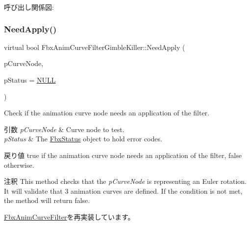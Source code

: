 呼び出し関係図\+:
\mbox{\label{class_fbx_anim_curve_filter_gimble_killer_a72a761452f1a110353be0b6cae920e24}} 
\subsubsection{\texorpdfstring{Need\+Apply()}{NeedApply()}\hspace{0.1cm}{\footnotesize\ttfamily [3/5]}}
{\footnotesize\ttfamily virtual bool Fbx\+Anim\+Curve\+Filter\+Gimble\+Killer\+::\+Need\+Apply (\begin{DoxyParamCaption}\item[{\hyperlink{class_fbx_anim_curve_node}{Fbx\+Anim\+Curve\+Node} \&}]{p\+Curve\+Node,  }\item[{\hyperlink{class_fbx_status}{Fbx\+Status} $\ast$}]{p\+Status = {\ttfamily \hyperlink{fbxarch_8h_a070d2ce7b6bb7e5c05602aa8c308d0c4}{N\+U\+LL}} }\end{DoxyParamCaption})\hspace{0.3cm}{\ttfamily [virtual]}}

Check if the animation curve node needs an application of the filter. 
\begin{DoxyParams}{引数}
{\em p\+Curve\+Node} & Curve node to test. \\
\hline
{\em p\+Status} & The \hyperlink{class_fbx_status}{Fbx\+Status} object to hold error codes. \\
\hline
\end{DoxyParams}
\begin{DoxyReturn}{戻り値}
{\ttfamily true} if the animation curve node needs an application of the filter, {\ttfamily false} otherwise. 
\end{DoxyReturn}
\begin{DoxyRemark}{注釈}
This method checks that the {\itshape p\+Curve\+Node} is representing an Euler rotation. It will validate that 3 animation curves are defined. If the condition is not met, the method will return {\ttfamily false}. 
\end{DoxyRemark}


\hyperlink{class_fbx_anim_curve_filter_a2a88d855d34bb1f2f22ca8386020b33a}{Fbx\+Anim\+Curve\+Filter}を再実装しています。


